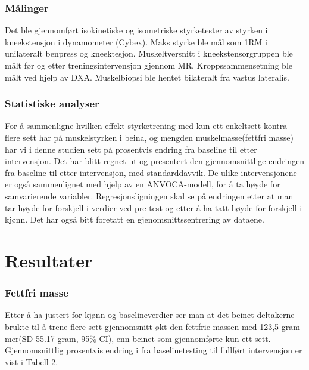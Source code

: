 \documentclass[
]{book}
\begin{document}
\hypertarget{muxe5linger}{%
\subsubsection{Målinger}\label{muxe5linger}}

Det ble gjennomført isokinetiske og isometriske styrketester av styrken i kneekstensjon i dynamometer (Cybex). Maks styrke ble mål som 1RM i unilateralt benpress og kneektesjon. Muskeltversnitt i kneekstensorgruppen ble målt før og etter treningsintervensjon gjennom MR. Kroppssammensetning ble målt ved hjelp av DXA. Muskelbiopsi ble hentet bilateralt fra vastus lateralis.

\hypertarget{statistiske-analyser}{%
\subsubsection{Statistiske analyser}\label{statistiske-analyser}}

For å sammenligne hvilken effekt styrketrening med kun ett enkeltsett kontra flere sett har på muskelstyrken i beina, og mengden muskelmasse(fettfri masse) har vi i denne studien sett på prosentvis endring fra baseline til etter intervensjon. Det har blitt regnet ut og presentert den gjennomsnittlige endringen fra baseline til etter intervensjon, med standarddavvik. De ulike intervensjonene er også sammenlignet med hjelp av en ANVOCA-modell, for å ta høyde for samvarierende variabler. Regresjonsligningen skal se på endringen etter at man tar høyde for forskjell i verdier ved pre-test og etter å ha tatt høyde for forskjell i kjønn. Det har også bitt foretatt en gjenomsnittssentrering av dataene.

\hypertarget{resultater-2}{%
\section{Resultater}\label{resultater-2}}

\hypertarget{fettfri-masse}{%
\subsubsection{Fettfri masse}\label{fettfri-masse}}

Etter å ha justert for kjønn og baselineverdier ser man at det beinet deltakerne brukte til å trene flere sett gjennomsnitt økt den fettfrie massen med 123,5 gram mer(SD 55.17 gram, 95\% CI), enn beinet som gjennomførte kun ett sett. Gjennomsnittlig prosentvis endring i fra baselinetesting til fullført intervensjon er vist i Tabell 2.
\end{document}

